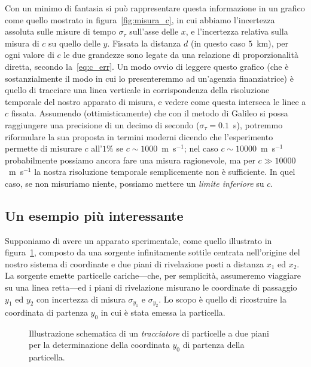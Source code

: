 Con un minimo di fantasia si può rappresentare questa informazione in un
grafico come quello mostrato in figura~\ref{fig:misura_c}, in cui abbiamo
l'incertezza assoluta sulle misure di tempo $\sigma_\tau$ sull'asse delle $x$,
e l'incertezza relativa sulla misura di $c$ su quello delle $y$. Fissata la
distanza $d$ (in questo caso $5$~km), per ogni valore di $c$ le due grandezze
sono legate da una relazione di proporzionalità diretta, secondo
la~\eqref{eq:c_err}. Un modo ovvio di leggere questo grafico (che è sostanzialmente
il modo in cui lo presenteremmo ad un'agenzia finanziatrice) è quello di
tracciare una linea verticale in corrispondenza della risoluzione temporale del
nostro apparato di misura, e vedere come questa interseca le linee a $c$ fissata.
Assumendo (ottimisticamente) che con il metodo di Galileo si possa raggiungere
una precisione di un decimo di secondo ($\sigma_\tau = 0.1$~s), potremmo
riformulare la sua proposta in termini moderni dicendo che l'esperimento
permette di misurare $c$ all'$1\%$ se $c \sim 1000$~m~s$^{-1}$; nel caso
$c \sim 10000$~m~s$^{-1}$ probabilmente possiamo ancora fare una misura
ragionevole, ma per $c \gg 10000$~m~s$^{-1}$ la nostra risoluzione temporale
semplicemente non è sufficiente. In quel caso, se non misuriamo niente,
possiamo mettere un \emph{limite inferiore} su $c$.


\subsection{Un esempio più interessante}

Supponiamo di avere un apparato sperimentale, come quello illustrato in
figura~\ref{fig:tracciatore}, composto da una sorgente infinitamente sottile
centrata nell'origine del nostro sistema di coordinate e due piani di rivelazione
posti a distanza $x_1$ ed $x_2$. La sorgente emette particelle cariche---che, per
semplicità, assumeremo viaggiare su una linea retta---ed i piani di
rivelazione misurano le coordinate di passaggio $y_1$ ed $y_2$ con incertezza
di misura $\sigma_{y_1}$ e $\sigma_{y_2}$. Lo scopo è quello di ricostruire la coordinata
di partenza $y_0$ in cui è stata emessa la particella.

\begin{figure}[!htbp]
  \center
  \caption{Illustrazione schematica di un \emph{tracciatore} di particelle a due
  piani per la determinazione della coordinata $y_0$ di partenza della particella.}
  \label{fig:tracciatore}
\end{figure}

